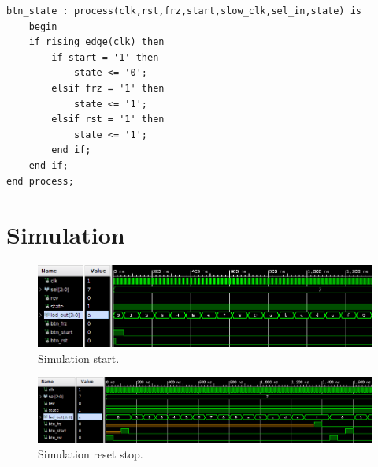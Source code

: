 \documentclass[11pt, a4paper]{article}
\begin{document}
\begin{lstlisting}[style=vhdl,label={lst:btn_state},caption={\texttt{btn\_state} process.}]
btn_state : process(clk,rst,frz,start,slow_clk,sel_in,state) is
    begin
    if rising_edge(clk) then
        if start = '1' then
            state <= '0';
        elsif frz = '1' then
            state <= '1';
        elsif rst = '1' then
            state <= '1';
        end if;
    end if;
end process;\end{lstlisting}

\section{Simulation}

\begin{figure}[H]
\centering
\includegraphics[width=1\textwidth]{../main/image/sim_1.png}
\caption{\label{fig:sim_1} Simulation start.}
\end{figure}



\begin{figure}[H]
\centering
\includegraphics[width=1\textwidth]{../main/image/sim_2.png}
\caption{\label{fig:sim_1} Simulation reset stop.}
\end{figure}
\end{document}

